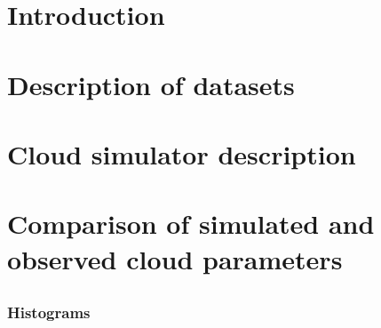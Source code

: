 \documentclass[a4paper,11pt]{article}
\begin{document}

\title{\doctitle}
\author{\docauthor}
\date{\today}
\maketitle
\tableofcontents


\newpage
\section{Introduction}\label{sec:intro}



\section{Description of datasets}\label{sec:datasets}



\section{Cloud simulator description}\label{sec:sim}



\section{Comparison of simulated and observed cloud parameters}
\label{sec:sim_vs_obs}


\subsection{\MonthYear}\label{subsec:monthly}

\FloatBarrier
\subsubsection{Histograms}\label{sss:histograms}


\end{document}
